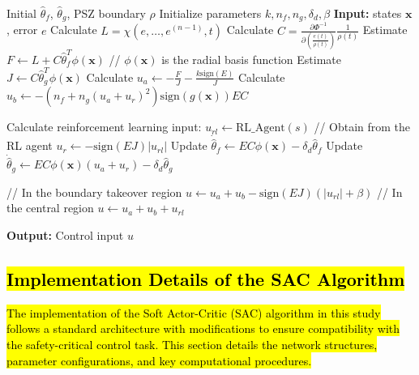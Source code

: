 \documentclass[preprint,12pt]{elsarticle}
\begin{document}
\begin{algorithm}
    \caption{Model-Free DRARLC Algorithm}
    \begin{algorithmic}[1]
    \State Initial $\hat{\theta}_f$, $\hat{\theta}_g$, PSZ boundary $\rho$
    \State Initialize parameters $k, n_f, n_g, \delta_d,\beta$
    \State \textbf{Input:} states $\mathbf{x}$, error $e$
        \State Calculate $L = \chi(e,\dots,e^{(n-1)},t)$
        \State Calculate $C = \frac{\partial \Phi^{-1}}{\partial \left(\frac{e(t)}{\rho(t)}\right)}\frac{1}{\rho(t)}$
        \State Estimate $F \gets L + C \hat{\theta}^{T}_f \phi(\mathbf{x})$ \hfill  // $\phi(\mathbf{x})$ is the radial basis function
        \State Estimate $J \gets C \hat{\theta}^{T}_g \phi(\mathbf{x})$
        \State Calculate $u_a \gets -\frac{F}{J} - \frac{k \mathrm{sign}(E)}{J}$
        \State Calculate $u_b \gets -(n_f + n_g(u_a + u_r)^2) \mathrm{sign}(g(\mathbf{x})) EC$
    
        \State Calculate reinforcement learning input:
        \State $u_{rl} \gets \text{RL\_Agent}(s)$ \hfill // Obtain from the RL agent
        \State $u_r \gets -\mathrm{sign}(EJ)|u_{rl}|$
        \State Update $\dot{\hat{\theta}}_f \gets EC\phi(\mathbf{x}) - \delta_d \hat{\theta}_f$
        \State Update $\dot{\hat{\theta}}_g \gets EC\phi(\mathbf{x})(u_a + u_r) - \delta_d \hat{\theta}_g$
        
         \hfill  // In the boundary takeover region 
            \State $u \gets u_a + u_b - \mathrm{sign}(EJ)(|u_{rl}| + \beta)$
         \hfill  // In the central region 
            \State $u \gets u_a + u_b + u_{rl}$
        \EndIf

    \EndWhile
    \State \textbf{Output:} Control input $u$
    \end{algorithmic}
    \label{A1}
\end{algorithm}

\subsection{\hl{Implementation Details of the SAC Algorithm}}

\hl{The implementation of the Soft Actor-Critic (SAC) algorithm in this study follows a standard architecture with modifications to ensure compatibility with the safety-critical control task. This section details the network structures, parameter configurations, and key computational procedures.}
\end{document}
